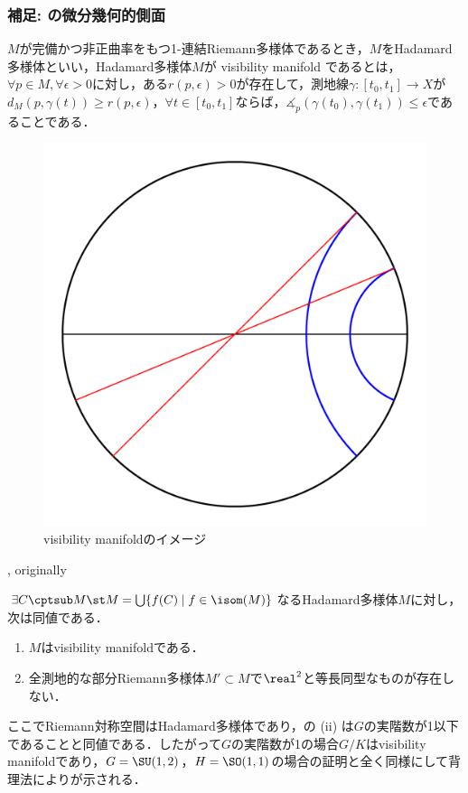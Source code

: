\subsubsection{補足: の微分幾何的側面}
\begin{defi}{\cite[Definition~1.3]{e72-1}}\label{def:visibility}

  $M$が完備かつ非正曲率をもつ1-連結Riemann多様体であるとき，$M$をHadamard多様体といい，Hadamard多様体$M$が visibility manifold であるとは，$\forall p\in M, \forall \epsilon > 0$に対し，ある$r(p,\epsilon) >0 $が存在して，測地線$\gamma\colon [t_0, t_1]\to X $が$d_{M}(p, \gamma(t))\geq r(p,\epsilon) $，$\forall t\in [t_0, t_1]$ならば，$\measuredangle_{p}(\gamma(t_0), \gamma(t_1)) \leq \epsilon $であることである．
\end{defi}

\begin{figure}[H]
  \centering
  \includegraphics[scale=0.3]{../graph/visibility.pdf}
  \caption{visibility manifoldのイメージ}
  \label{fig:visibility}
\end{figure}


\begin{thm}{\cite[p.~296, 9.33~Theorem]{bh99}, originally \cite[Theorem~4.1]{e72-2}}\label{thm:visibility-and-rank}
  
  $\exists C\cptsub M\st M = \bigcup\{f(C)\mid f\in \isom(M) \}  $なるHadamard多様体$M$に対し，次は同値である．
  \vspace{-1em}
  \begin{enumerate}
    \renewcommand{\labelenumi}{(\roman{enumi})}
  \item $M$はvisibility manifoldである．
  \item 全測地的な部分Riemann多様体$M'\subset M$で$\real^2$と等長同型なものが存在しない．
  \end{enumerate}
\end{thm}

ここでRiemann対称空間はHadamard多様体であり，の (ii) は$G$の実階数が1以下であることと同値である．したがって$G$の実階数が1の場合$G/K$はvisibility manifoldであり，$G = \SU(1,2) $，$H= \SO(1,1)$の場合の証明と全く同様にして背理法によりが示される．
